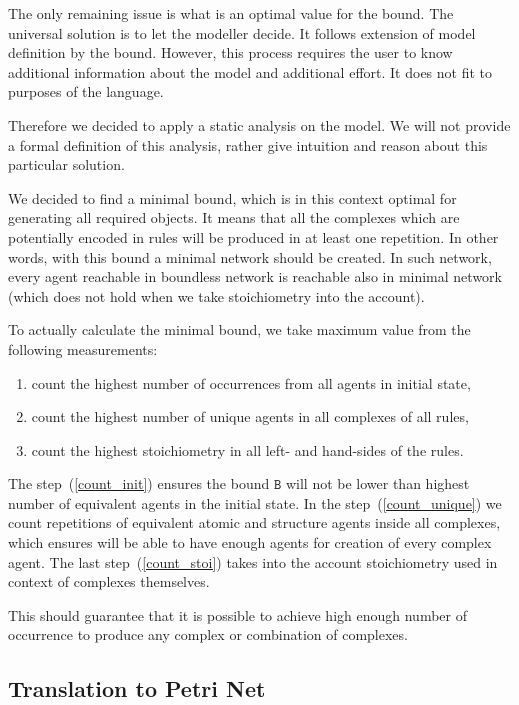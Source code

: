 \documentclass[12pt]{fithesis2}
\begin{document}
The only remaining issue is what is an optimal value for the bound. The universal solution is to let the modeller decide. It follows extension of model definition by the bound. However, this process requires the user to know additional information about the model and additional effort. It does not fit to purposes of the language.

Therefore we decided to apply a static analysis on the model. We will not provide a formal definition of this analysis, rather give intuition and reason about this particular solution.

We decided to find a minimal bound, which is in this context optimal for generating all required objects. It means that all the complexes which are potentially encoded in rules  will be produced in at least one repetition. In other words, with this bound a minimal network should be created. In such network, every agent reachable in boundless network is reachable also in minimal network (which does not hold when we take stoichiometry into the account).

To actually calculate the minimal bound, we take maximum value from the following measurements:

\begin{enumerate}
  \item \label{count_init} count the highest number of occurrences from all agents in initial state,
  \item \label{count_unique} count the highest number of unique agents in all complexes of all rules,
  \item \label{count_stoi} count the highest stoichiometry in all left- and hand-sides of the rules.
\end{enumerate}

The step~(\ref{count_init}) ensures the bound $\mathtt{B}$ will not be lower than highest number of equivalent agents in the initial state. In the step~(\ref{count_unique}) we count repetitions of equivalent atomic and structure agents inside all complexes, which ensures will be able to have enough agents for creation of every complex agent. The last step~(\ref{count_stoi}) takes into the account stoichiometry used in context of complexes themselves.

This should guarantee that it is possible to achieve high enough number of occurrence to produce any complex or combination of complexes.

\subsection{Translation to Petri Net}
\end{document}

